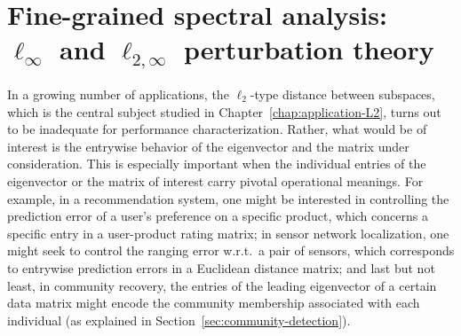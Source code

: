 \chapter[Fine-grained analysis:  $\ell_{\infty}$ and $\ell_{2,\infty}$ perturbation theory]{Fine-grained spectral analysis: \\ $\ell_{\infty}$ and $\ell_{2,\infty}$ perturbation theory}
\label{cha:Linf-theory}


In a growing number of applications, the $\ell_2$-type distance between subspaces, which is the central subject studied in Chapter~\ref{chap:application-L2}, turns out to be inadequate for performance characterization. Rather, what would be of interest is the entrywise behavior of the eigenvector and the matrix under consideration. This is especially important when the individual entries of the eigenvector or the matrix of interest carry pivotal operational meanings. For example, in a recommendation system, one might be interested in controlling the prediction error of a user's preference on a specific product, which  concerns  a specific entry in a user-product rating matrix; in sensor network localization, one might seek to control the ranging error w.r.t.~a pair of sensors, which corresponds to  entrywise prediction errors in a Euclidean distance matrix; and last but not least, in community recovery, the entries of the leading eigenvector of a certain data matrix might encode the community membership associated with each individual (as explained in Section~\ref{sec:community-detection}).

